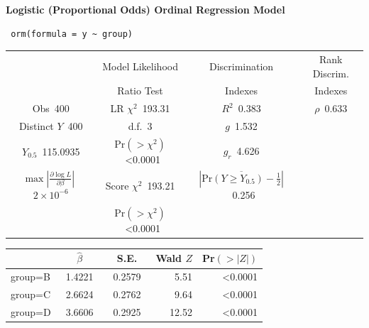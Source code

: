  \centerline{\textbf{Logistic (Proportional Odds) Ordinal Regression Model}}
 
 \begin{verbatim}
 orm(formula = y ~ group)
 \end{verbatim}
 
 {\selectfont \begin{center}\begin{tabular}{|c|c|c|c|}\hline
&Model Likelihood&Discrimination&Rank Discrim.\\
&Ratio Test& Indexes&Indexes\\\hline
Obs~\hfill 400&LR $\chi^{2}$~\hfill 193.31&$R^{2}$~\hfill 0.383&$\rho$~\hfill 0.633\\
Distinct $Y$~\hfill 400&d.f.~\hfill 3&$g$~\hfill 1.532&\\
$Y_{0.5}$~\hfill 115.0935&Pr$(>\chi^{2})$~\hfill \textless 0.0001&$g_{r}$~\hfill 4.626&\\
$\max|\frac{\partial\log L}{\partial \beta}|$~\hfill $2\!\times\!10^{-6}$&Score $\chi^{2}$~\hfill 193.21&$|\overline{\mathrm{Pr}(Y\geq Y_{0.5})-\frac{1}{2}}|$~\hfill 0.256&\\
&Pr$(>\chi^{2})$~\hfill \textless 0.0001&&\\
\hline
\end{tabular}
\end{center}}
 
 \setlongtables\begin{longtable}{lrrrr}\hline
 \multicolumn{1}{l}{}&\multicolumn{1}{c}{$\hat{\beta}$}&\multicolumn{1}{c}{S.E.}&\multicolumn{1}{c}{Wald $Z$}&\multicolumn{1}{c}{Pr$(>|Z|)$}\tabularnewline
 \hline
 \endhead
 \hline
 \endfoot
 group=B&~1.4221~&~0.2579~& 5.51&\textless 0.0001\tabularnewline
 group=C&~2.6624~&~0.2762~& 9.64&\textless 0.0001\tabularnewline
 group=D&~3.6606~&~0.2925~&12.52&\textless 0.0001\tabularnewline
 \hline
 \end{longtable}
 \addtocounter{table}{-1}

